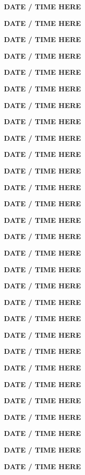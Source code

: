 \documentclass[12pt]{extbook}
\newcommand{\abstract}[2]{{
\begin{center}
\bfseries #1
\end{center}}
\par
}
\begin{document}
\clearpage


\abstract{DATE / TIME HERE}{abstracts/Kipfer} %



\abstract{DATE / TIME HERE}{abstracts/Iwe}
\abstract{DATE / TIME HERE}{abstracts/Slagter} %


\abstract{DATE / TIME HERE}{abstracts/Marion} %
\abstract{DATE / TIME HERE}{abstracts/Wang}
\abstract{DATE / TIME HERE}{abstracts/Blanc}
\abstract{DATE / TIME HERE}{abstracts/Brennwald}
\abstract{DATE / TIME HERE}{abstracts/Currle} %
\abstract{DATE / TIME HERE}{abstracts/Ortega}

\abstract{DATE / TIME HERE}{abstracts/GroegerTrampe}
\abstract{DATE / TIME HERE}{abstracts/vanRooyen} %
\abstract{DATE / TIME HERE}{abstracts/Zhao} %
\abstract{DATE / TIME HERE}{abstracts/Musy} %


\abstract{DATE / TIME HERE}{abstracts/Engelhardt}
\abstract{DATE / TIME HERE}{abstracts/Picard}
\abstract{DATE / TIME HERE}{abstracts/Hillegonds}

\abstract{DATE / TIME HERE}{abstracts/Dutoit} %
\abstract{DATE / TIME HERE}{abstracts/Kim} %
\abstract{DATE / TIME HERE}{abstracts/Giroud}
\abstract{DATE / TIME HERE}{abstracts/Lightfoot}
\abstract{DATE / TIME HERE}{abstracts/Roques}

\abstract{DATE / TIME HERE}{abstracts/Strauch_Zimmer} 

\abstract{DATE / TIME HERE}{abstracts/Daskalopoulou} %
\abstract{DATE / TIME HERE}{abstracts/Tomonaga}


\abstract{DATE / TIME HERE}{abstracts/Kimani}
\abstract{DATE / TIME HERE}{abstracts/Mtili}

\abstract{DATE / TIME HERE}{abstracts/Finger} %


\abstract{DATE / TIME HERE}{abstracts/Jacops} %
\abstract{DATE / TIME HERE}{abstracts/vanLeeuw} %




\end{document}
